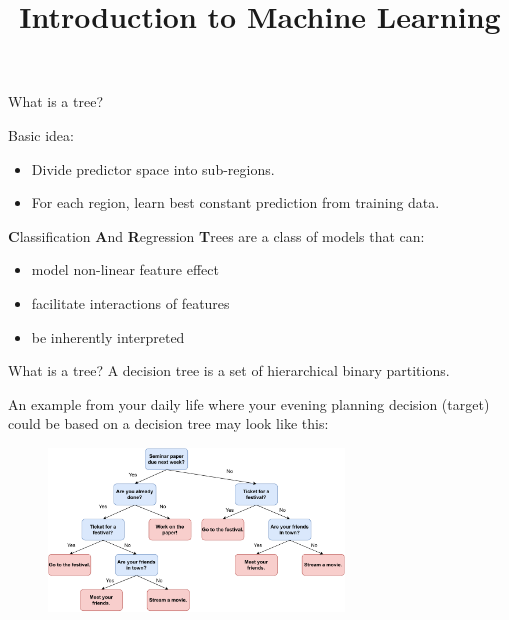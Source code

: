 \documentclass[11pt,compress,t,notes=noshow, xcolor=table]{beamer}
\title{Introduction to Machine Learning}
\institute{\href{https://compstat-lmu.github.io/lecture_i2ml/}{compstat-lmu.github.io/lecture\_i2ml}}
\date{}
\begin{document}
\sloppy

\begin{vbframe}{What is a tree?}

Basic idea: 
\begin{itemize}
\item Divide predictor space into sub-regions.%
\item For each region, learn best constant prediction from  training data. %
\end{itemize}

\vspace{0.5cm}

    \textbf{C}lassification \textbf{A}nd \textbf{R}egression \textbf{T}rees are a class of models that can:
  \begin{itemize}
    \item model non-linear feature effect
    \item facilitate interactions of features
    \item be inherently interpreted
  \end{itemize}
\end{vbframe}

\begin{vbframe}{What is a tree?}
A decision tree is a set of hierarchical binary partitions.

An example from your daily life where your evening planning decision (target) could be based on a decision tree may look like this:

  \begin{figure}
    \centering
\includegraphics[width=0.7\textwidth, keepaspectratio]{figure/nutshell-example.pdf}
    \end{figure}


\end{vbframe}
\end{document}
